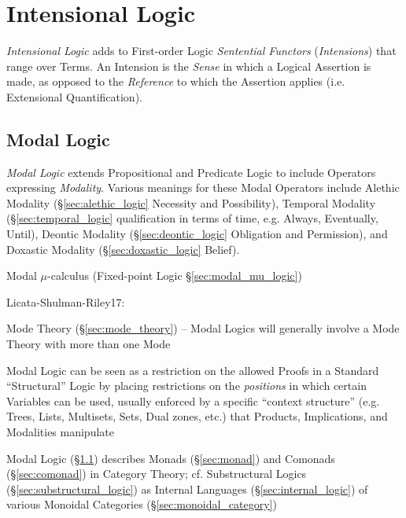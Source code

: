 \section{Intensional Logic}\label{sec:intensional_logic}

\emph{Intensional Logic} adds to First-order Logic \emph{Sentential
  Functors} (\emph{Intensions}) that range over Terms. An Intension is
the \emph{Sense} in which a Logical Assertion is made, as opposed to
the \emph{Reference} to which the Assertion applies (i.e. Extensional
Quantification).



\subsection{Modal Logic}\label{sec:modal_logic}

\emph{Modal Logic} extends Propositional and Predicate Logic to
include Operators expressing \emph{Modality}. Various meanings for
these Modal Operators include Alethic Modality
(\S\ref{sec:alethic_logic} Necessity and Possibility), Temporal
Modality (\S\ref{sec:temporal_logic} qualification in terms of time,
e.g. Always, Eventually, Until), Deontic Modality
(\S\ref{sec:deontic_logic} Obligation and Permission), and Doxastic
Modality (\S\ref{sec:doxastic_logic} Belief).

\fist Modal $\mu$-calculus (Fixed-point Logic
\S\ref{sec:modal_mu_logic})

Licata-Shulman-Riley17:

\fist Mode Theory (\S\ref{sec:mode_theory}) -- Modal Logics will
generally involve a Mode Theory with more than one Mode

Modal Logic can be seen as a restriction on the allowed Proofs in a
Standard ``Structural'' Logic by placing restrictions on the
\emph{positions} in which certain Variables can be used, usually
enforced by a specific ``context structure'' (e.g. Trees, Lists,
Multisets, Sets, Dual zones, etc.) that Products, Implications, and
Modalities manipulate

Modal Logic (\S\ref{sec:modal_logic}) describes Monads
(\S\ref{sec:monad}) and Comonads (\S\ref{sec:comonad}) in Category
Theory; cf. Substructural Logics (\S\ref{sec:substructural_logic}) as
Internal Languages (\S\ref{sec:internal_logic}) of various Monoidal
Categories (\S\ref{sec:monoidal_category})

